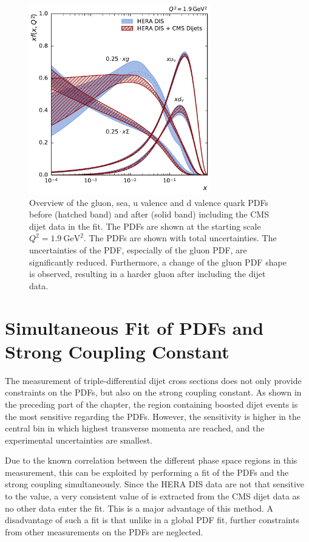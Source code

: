 \begin{figure}[tbp]
  \centering
  \includegraphics[width=0.7\textwidth]{figures/pdf_constraints/pdfcomp_direct_overview_1.9.pdf}\hfill%
  \caption[Overview of gluon and quark PDFs]{Overview of the gluon, sea, u
  valence and d valence quark PDFs before (hatched band) and after (solid band)
  including the CMS dijet data in the fit. The PDFs are shown at the starting
  scale $Q^2 = \SI{1.9}{\GeV \squared}$. The PDFs are shown with total
  uncertainties. The uncertainties of the PDF, especially of the gluon PDF, are
  significantly reduced. Furthermore, a change of the gluon PDF shape is observed, resulting in a
  harder gluon after including the dijet data.}
  \label{fig:pdfconstraints:overview:19}
\end{figure}

\section{Simultaneous Fit of PDFs and Strong Coupling Constant}

The measurement of triple-differential dijet cross sections does not only
provide constraints on the PDFs, but also on the strong coupling constant. As
shown in the preceding part of the chapter, the region containing boosted dijet events is
the most sensitive regarding the PDFs. However, the \as sensitivity is higher in
the central bin in which highest transverse momenta are reached, and the
experimental uncertainties are smallest.

Due to the known correlation between the different phase space regions in this
measurement, this can be exploited by performing a fit of the PDFs and the
strong coupling simultaneously. Since the HERA DIS data are not that sensitive
to the \asmz value, a very consistent value of \asmz is extracted from the CMS
dijet data as no other data enter the fit. This is a major advantage of this
method. A disadvantage of such a fit is that unlike in a global PDF fit, further
constraints from other measurements on the PDFs are neglected. 

